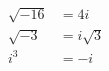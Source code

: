 \documentclass[preview]{standalone}
\begin{document}
\begin{align*}
\sqrt{-16} &= 4i \\  \sqrt{-3} &= i\sqrt{3} \\ i^3 &= -i
\end{align*}
\end{document}
